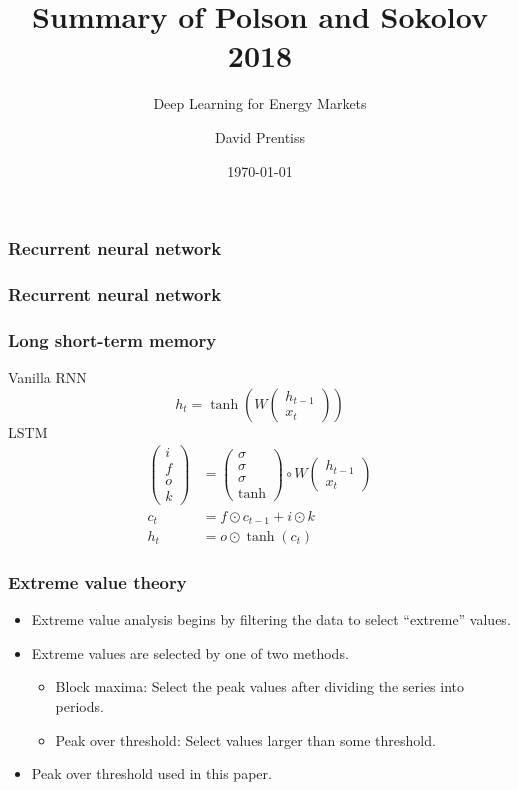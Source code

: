 \documentclass{beamer}
\begin{document}
\title{Summary of Polson and Sokolov 2018}
\subtitle{Deep Learning for Energy Markets}
\author{David Prentiss}
\date{\today}

\frame{\titlepage}

\begin{frame}
  \frametitle{Recurrent neural network}
\end{frame}

\begin{frame}
  \frametitle{Recurrent neural network}
\end{frame}

\begin{frame}
  \frametitle{Long short-term memory}
  Vanilla RNN
  \begin{equation*}
    h_t=\tanh\left( W
      \begin{pmatrix}
        h_{t-1} \\ x_t
      \end{pmatrix}
    \right)
  \end{equation*}
  LSTM
  \begin{align*}
    \begin{pmatrix}
      i \\ f \\ o \\ k
    \end{pmatrix}
    &=
    \begin{pmatrix}
      \sigma \\ \sigma \\ \sigma \\ \tanh
    \end{pmatrix}
    \circ
    W
    \begin{pmatrix}
      h_{t-1} \\ x_t
    \end{pmatrix}
    \\
    c_t &= f \odot c_{t-1} + i \odot k \\
    h_t &= o \odot \tanh\left(c_t\right)
  \end{align*}
\end{frame}

\begin{frame}
  \frametitle{Extreme value theory}
  \begin{itemize}
  \item Extreme value analysis begins by filtering the data to select
    ``extreme'' values.
    \item Extreme values are selected by one of two methods.
  \begin{itemize}
  \item Block maxima: Select the peak values after dividing the series into periods.
  \item Peak over threshold: Select values larger than some threshold.
  \end{itemize}
    \item Peak over threshold used in this paper.
  \end{itemize}
\end{frame}
\end{document}

